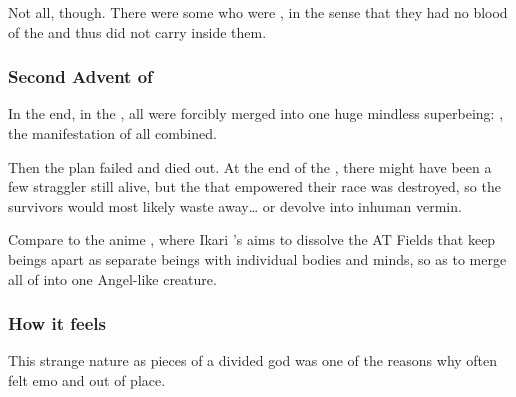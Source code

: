 Not all, though. 
There were some \humans who were , in the sense that they had no blood of the {} and thus did not carry \Lithrim inside them. 





\subsubsection{Second Advent of \Lithrim}
In the end, in the \thirdbanewar, all \humans{} were forcibly merged into one huge mindless superbeing:
\Lithrim, the manifestation of all \humanity{} combined. 
 
Then the plan failed and \humanity{} died out. 
At the end of the \thirdbanewar, there might have been a few straggler \humans{} still alive, but the \matrix{} that empowered their race was destroyed, so the survivors would most likely waste away\ldots{} or devolve into inhuman vermin. 

Compare to the anime \cite{Anime:NeonGenesisEvangelion}, where Ikari \Gendou's  aims to dissolve the AT Fields that keep \human{} beings apart as separate beings with individual bodies and minds, so as to merge all of \humanity{} into one Angel-like creature. 






\subsubsection{How it feels}
This strange nature as pieces of a divided god was one of the reasons why \humans{} often felt emo and out of place. 

